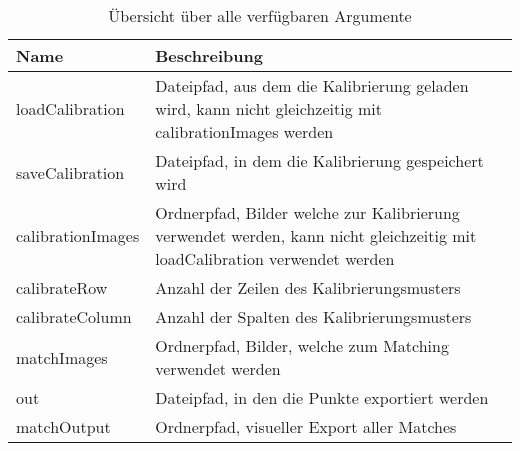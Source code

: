 \begin{table}[]
\centering
\begin{tabularx}{\textwidth}{ |l|X| }
\hline
Name              & Beschreibung                                                                                                              \\ \hline
loadCalibration   & Dateipfad, aus dem die Kalibrierung geladen wird, kann nicht gleichzeitig mit calibrationImages werden                    \\
saveCalibration   & Dateipfad, in dem die Kalibrierung gespeichert wird                                                                       \\
calibrationImages & Ordnerpfad, Bilder welche zur Kalibrierung verwendet werden, kann nicht gleichzeitig mit loadCalibration verwendet werden \\
calibrateRow      & Anzahl der Zeilen des Kalibrierungsmusters                                                                                \\
calibrateColumn   & Anzahl der Spalten des Kalibrierungsmusters                                                                               \\
matchImages       & Ordnerpfad, Bilder, welche zum Matching verwendet werden                                                                  \\
out               & Dateipfad, in den die Punkte exportiert werden                                                                            \\
matchOutput       & Ordnerpfad, visueller Export aller Matches                                                                                \\ \hline
\end{tabularx}
\caption{Übersicht über alle verfügbaren Argumente}
\label{tab:arguments}
\end{table}


